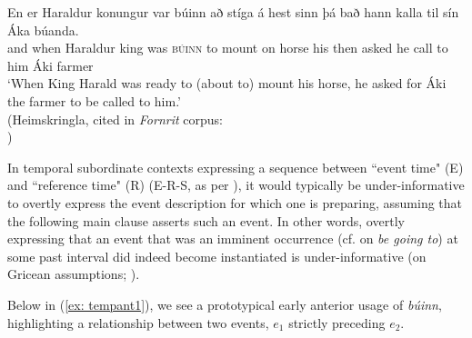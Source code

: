 \documentclass[output=paper,colorlinks,citecolor=brown]{langscibook}
\begin{document}
\ea
\gll En er Haraldur konungur var búinn að stíga á hest sinn þá bað hann kalla til sín Áka búanda.\\
and when Haraldur king was \textsc{búinn} to mount on horse his then asked he call to him Áki farmer\\
\glt `When King Harald was ready to (about to) mount his horse, he asked for Áki the farmer to be called to him.' \\
\hfill (Heimskringla, cited in \textit{Fornrit} corpus:\\
\hfill \citeauthor{IslensktTextasafn2019} \citeyear{IslensktTextasafn2019})
\z

In temporal subordinate contexts expressing a sequence between  ``event time" (E) and ``reference time" (R) (E-R-S, as per \cite{Reichenbach1947}), it would typically be under-informative to overtly express the event description for which one is preparing, assuming that the following main clause asserts such an event. In other words, overtly expressing that an event that was an imminent occurrence (cf. \citeauthor{eckardt2006meaning} \citeyear[91--127]{eckardt2006meaning} on \textit{be going to}) at some past interval did indeed become instantiated is under-informative (on Gricean assumptions; \cite{holvoet2014phasal}).

Below in (\ref{ex: tempant1}), we see a prototypical early anterior usage of \textit{búinn}, highlighting a relationship between two events, $e_1$ strictly preceding $e_2$.
\end{document}
